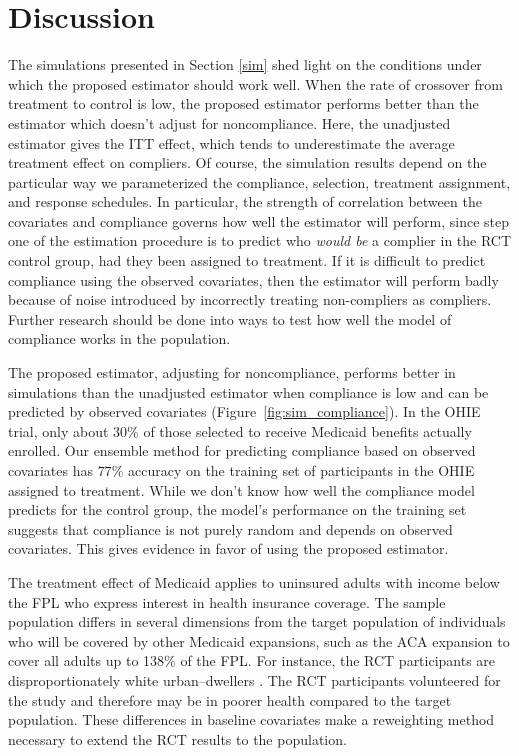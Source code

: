 \documentclass[12pt]{article}
\begin{document}
\section{Discussion}

The simulations presented in Section \ref{sim} shed light on the conditions under which the proposed estimator should work well.  When the rate of crossover from treatment to control is low, the proposed estimator performs better than the estimator which doesn't adjust for noncompliance.  Here, the unadjusted estimator gives the ITT effect, which tends to underestimate the average treatment effect on compliers. Of course, the simulation results depend on the particular way we parameterized the compliance, selection, treatment assignment, and response schedules.  In particular, the strength of correlation between the covariates and compliance governs how well the estimator will perform, since step one of the estimation procedure is to predict who \textit{would be} a complier in the RCT control group, had they been assigned to treatment. If it is difficult to predict compliance using the observed covariates, then the estimator will perform badly because of noise introduced by incorrectly treating non-compliers as compliers.  Further research should be done into ways to test how well the model of compliance works in the population. 

The proposed estimator, adjusting for noncompliance, performs better in simulations than the unadjusted estimator when compliance is low and can be predicted by observed covariates (Figure~\ref{fig:sim_compliance}).  In the OHIE trial, only about $30\%$ of those selected to receive Medicaid benefits actually enrolled. Our ensemble method for predicting compliance based on observed covariates has $77\%$ accuracy on the training set of participants in the OHIE assigned to treatment.  While we don't know how well the compliance model predicts for the control group, the model's performance on the training set suggests that compliance is not purely random and depends on observed covariates.  This gives evidence in favor of using the proposed estimator.  

The treatment effect of Medicaid applies to uninsured adults with income below the FPL who express interest in health insurance coverage. The sample population differs in several dimensions from the target population of individuals who will be covered by other Medicaid expansions, such as the ACA expansion to cover all adults up to 138\% of the FPL. For instance, the RCT participants are disproportionately white urban--dwellers \citep{Taubman}. The RCT participants volunteered for the study and therefore may be in poorer health compared to the target population. These differences in baseline covariates make a reweighting method necessary to extend the RCT results to the population. 
\end{document}
